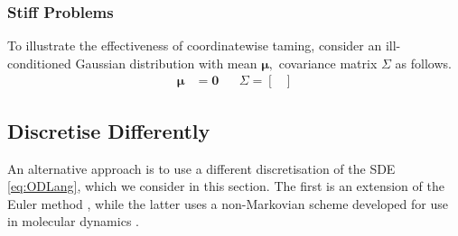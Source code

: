 \subsubsection{Stiff Problems}
To illustrate the effectiveness of coordinatewise taming, consider an ill-conditioned Gaussian distribution with mean \(\mathbf{\mu},\) covariance matrix \(\Sigma\) as follows.
\begin{align*}
    \mathbf{\mu} &= \mathbf{0} && \Sigma = \begin{bmatrix}  \end{bmatrix}
    
\end{align*}
\subsection{Discretise Differently}
An alternative approach is to use a different discretisation of the SDE \eqref{eq:ODLang}, which we consider in this section. The first is an extension of the Euler method \cite{Sabanis18tHOLA}, while the latter uses a non-Markovian scheme developed for use in molecular dynamics \cite{LM12}.
